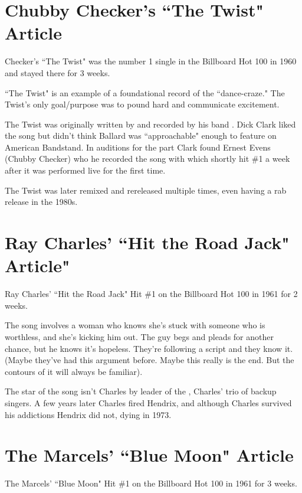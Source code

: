 \documentclass[12pt, a4paper, twoside, openright, titlepage]{book}
\begin{document}
\section{Chubby Checker's ``The Twist" Article}

Checker's ``The Twist" was the number 1 single in the Billboard Hot 100 in 1960 and stayed there for 3 weeks.

``The Twist" is an example of a foundational record of the ``dance-craze." The Twist's only goal/purpose was to pound hard and communicate excitement. 

\begin{rmk}{}{}
    The Twist was originally written by  and recorded by his band . Dick Clark liked the song but didn't think Ballard was ``approachable" enough to feature on American Bandstand. In auditions for the part Clark found Ernest Evens (Chubby Checker) who he recorded the song with which shortly hit \#1 a week after it was performed live for the first time.
\end{rmk}

The Twist was later remixed and rereleased multiple times, even having a rab release in the 1980s.


\section{Ray Charles' ``Hit the Road Jack" Article"}

Ray Charles'  ``Hit the Road Jack" Hit \#1 on the Billboard Hot 100 in 1961 for 2 weeks.

The song involves a woman who knows she's stuck with someone who is worthless, and she's kicking him out. The guy begs and pleads for another chance, but he knows it's hopeless. They're following a script and they know it. (Maybe they've had this argument before. Maybe this really is the end. But the contours of it will always be familiar).

The star of the song isn't Charles by  leader of the , Charles' trio of backup singers. A few years later Charles fired Hendrix, and although Charles survived his addictions Hendrix did not, dying in 1973.


\section{The Marcels' ``Blue Moon" Article}

The Marcels' ``Blue Moon" Hit \#1 on the Billboard Hot 100 in 1961 for 3 weeks.
\end{document}
